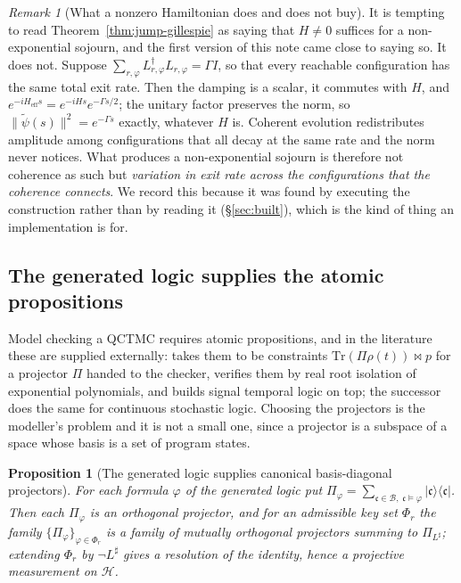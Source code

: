 \documentclass[11pt,a4paper]{article}
\theoremstyle{plain}
\newtheorem{proposition}[theorem]{Proposition}
\theoremstyle{definition}
\theoremstyle{remark}
\newtheorem{remark}[theorem]{Remark}
\newcommand{\Lop}{L}
\newcommand{\Heff}{H_{\mathrm{eff}}}
\begin{document}
\begin{remark}[What a nonzero Hamiltonian does and does not buy]
\label{rem:scalar-damping}
It is tempting to read Theorem~\ref{thm:jump-gillespie} as saying that $H \neq 0$ suffices for a
non-exponential sojourn, and the first version of this note came close to saying so. It does not.
Suppose $\sum_{r,\varphi}\Lop^\dagger_{r,\varphi}\Lop_{r,\varphi} = \Gamma I$, so that every
reachable configuration has the same total exit rate. Then the damping is a scalar, it commutes with
$H$, and $e^{-i\Heff s} = e^{-iHs}e^{-\Gamma s/2}$; the unitary factor preserves the norm, so
$\|\tilde\psi(s)\|^2 = e^{-\Gamma s}$ exactly, whatever $H$ is. Coherent evolution redistributes
amplitude among configurations that all decay at the same rate and the norm never notices. What
produces a non-exponential sojourn is therefore not coherence as such but \emph{variation in exit
rate across the configurations that the coherence connects}. We record this because it was found by
executing the construction rather than by reading it (\S\ref{sec:built}), which is the kind of thing
an implementation is for.
\end{remark}

\subsection{The generated logic supplies the atomic propositions}
\label{sec:qctmc-logic}

Model checking a QCTMC requires atomic propositions, and in the literature these are supplied
externally: \cite{qctmc} takes them to be constraints $\mathrm{Tr}(\Pi \rho(t)) \bowtie p$ for a
projector $\Pi$ handed to the checker, verifies them by real root isolation of exponential
polynomials, and builds signal temporal logic on top; the successor \cite{qctmc-csl} does the same
for continuous stochastic logic. Choosing the projectors is the modeller's problem and it is not a
small one, since a projector is a subspace of a space whose basis is a set of program states.

\begin{proposition}[The generated logic supplies canonical basis-diagonal projectors]
\label{prop:projective}
For each formula $\varphi$ of the generated logic put
$\Pi_\varphi = \sum_{\mathfrak{c} \in \mathcal{B},\; \mathfrak{c} \models \varphi}
|\mathfrak{c}\rangle\langle \mathfrak{c}|$. Then each $\Pi_\varphi$ is an orthogonal projector, and
for an admissible key set $\Phi_r$ the family $\{\Pi_\varphi\}_{\varphi \in \Phi_r}$ is a family of
mutually orthogonal projectors summing to $\Pi_{L^\sharp}$; extending $\Phi_r$ by $\neg L^\sharp$
gives a resolution of the identity, hence a projective measurement on $\mathcal{H}$.
\end{proposition}
\end{document}
